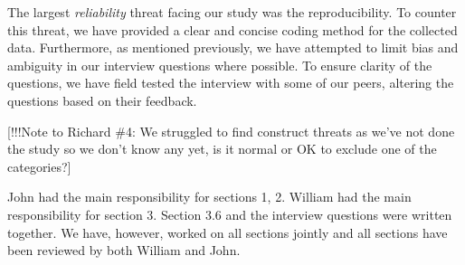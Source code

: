 \documentclass[10pt,twocolumn]{article}
\begin{document}
The largest \textit{reliability} threat facing our study was the reproducibility. To counter this threat, we have provided a clear and concise coding method for the collected data. Furthermore, as mentioned previously, we have attempted to limit bias and ambiguity in our interview questions where possible. To ensure clarity of the questions, we have field tested the interview with some of our peers, altering the questions based on their feedback.

[!!!Note to Richard \#4: We struggled to find construct threats as we've not done the study so we don't know any yet, is it normal or OK to exclude one of the categories?]





John had the main responsibility for sections 1, 2. William had the main responsibility for section 3. Section 3.6 and the interview questions were written together. We have, however, worked on all sections jointly and all sections have been reviewed by both William and John. 

\noindent
\end{document}
